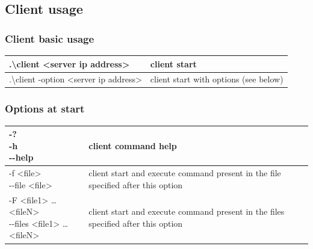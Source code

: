 \documentclass[a4paper,11pt]{report}
\begin{document}
    \subsection*{Client usage}

    \begin{centering}
        \subsubsection*{Client basic usage}
        \begin{tabular}{|m{6cm}|m{6cm}|}

            \hline
            .\textbackslash client <server ip address> & client start \\
            \hline
            .\textbackslash client -option <server ip address> & client start with options (see below) \\
            \hline
        \end{tabular}
        \subsubsection*{Options at start}
        \begin{tabular}{|m{4.5cm}|m{10.5cm}|}
            \hline
            \shortstack{-? \\ -h \\ -{}-help} & client command help \\
            \hline
            \shortstack{-f <file> \\ -{}-file <file>} & client start and execute command present in the file specified after this option \\
            \hline
            \shortstack{-F <file1> \ldots <fileN> \\ -{}-files <file1> \ldots <fileN>} & client start and execute command present in the files specified after this option \\
            \hline
        \end{tabular}


\end{centering}
\end{document}
